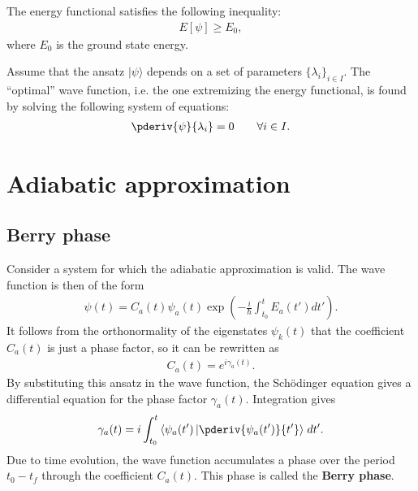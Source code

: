 
    \begin{property}
        The energy functional satisfies the following inequality:
        \begin{gather}
            E[\psi]\geq E_0,
        \end{gather}
        where $E_0$ is the ground state energy.
    \end{property}

    \begin{method}
        Assume that the ansatz $|\psi\rangle$ depends on a set of parameters $\{\lambda_i\}_{i\in I}$. The ``optimal'' wave function, i.e. the one extremizing the energy functional, is found by solving the following system of equations:
        \begin{gather}
            \pderiv{\psi}{\lambda_i} = 0\qquad\forall i\in I.
        \end{gather}
    \end{method}

\section{Adiabatic approximation}
\subsection{Berry phase}

    Consider a system for which the adiabatic approximation is valid. The wave function is then of the form
    \begin{gather}
        \psi(t) = C_a(t)\psi_a(t)\exp\left(-\frac{i}{\hbar}\int_{t_0}^tE_a(t')dt'\right).
    \end{gather}
    It follows from the orthonormality of the eigenstates $\psi_k(t)$ that the coefficient $C_a(t)$ is just a phase factor, so it can be rewritten as
    \begin{gather}
        C_a(t) = e^{i\gamma_a(t)}.
    \end{gather}
    By substituting this ansatz in the wave function, the Sch\"odinger equation gives a differential equation for the phase factor $\gamma_a(t)$. Integration gives
    \begin{gather}
        \label{perturbation:phase_factor}
        \gamma_a(t) = i\int_{t_0}^t\left\langle\psi_a(t')\left|\pderiv{\psi_a(t')}{t'}\right\rangle\right.dt'.
    \end{gather}
    Due to time evolution, the wave function accumulates a phase over the period $t_0-t_f$ through the coefficient $C_a(t)$. This phase is called the \textbf{Berry phase}.

